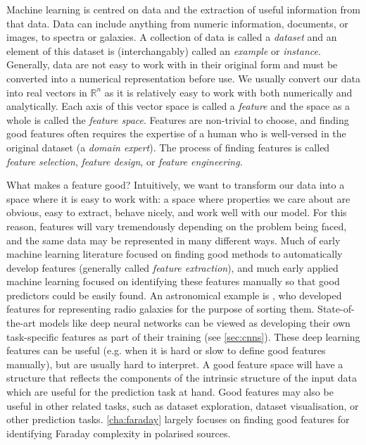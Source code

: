 \documentclass[11pt, a4paper]{book}
\newcommand{\defn}[1]{\emph{#1}}
\begin{document}
    Machine learning is centred on data and the extraction of useful information from that data. Data can include anything from numeric information, documents, or images, to spectra or galaxies. A collection of data is called a \defn{dataset} and an element of this dataset is (interchangably) called an \defn{example} or \defn{instance}. Generally, data are not easy to work with in their original form and must be converted into a numerical representation before use. We usually convert our data into real vectors in $\mathbb R^n$ as it is relatively easy to work with both numerically and analytically. Each axis of this vector space is called a \defn{feature} and the space as a whole is called the \defn{feature space}. Features are non-trivial to choose, and finding good features often requires the expertise of a human who is well-versed in the original dataset (a \defn{domain expert}). The process of finding features is called \defn{feature selection}, \defn{feature design}, or \defn{feature engineering}.

    What makes a feature good? Intuitively, we want to transform our data into a space where it is easy to work with: a space where properties we care about are obvious, easy to extract, behave nicely, and work well with our model. For this reason, features will vary tremendously depending on the problem being faced, and the same data may be represented in many different ways. Much of early machine learning literature focused on finding good methods to automatically develop features (generally called \defn{feature extraction}), and much early applied machine learning focused on identifying these features manually so that good predictors could be easily found. An astronomical example is \citet{proctor06}, who developed features for representing radio galaxies for the purpose of sorting them. State-of-the-art models like deep neural networks \citep[e.g.][]{dieleman15cnn} can be viewed as developing their own task-specific features as part of their training (see \autoref{sec:cnns}). These deep learning features can be useful (e.g. when it is hard or slow to define good features manually), but are usually hard to interpret. A good feature space will have a structure that reflects the components of the intrinsic structure of the input data which are useful for the prediction task at hand. Good features may also be useful in other related tasks, such as dataset exploration, dataset visualisation, or other prediction tasks. \autoref{cha:faraday} largely focuses on finding good features for identifying Faraday complexity in polarised sources.
\end{document}
